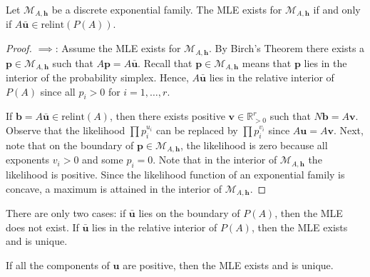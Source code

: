 \begin{mdframed}
\begin{thm}
  Let \( \mathcal{M}_{A, \mathbf h} \) be a discrete exponential family. The MLE exists for \( \mathcal{M}_{A, \mathbf{h}} \) if and only if \( A \bar{\mathbf u}  \in \mathrm{relint}(P(A))\).
\end{thm}
\end{mdframed}

\begin{proof}
  \( \implies \):
  Assume the MLE exists for \( \mathcal{M}_{A, \mathbf h} \). By Birch's Theorem there exists a \( \mathbf p \in \mathcal{M}_{A, \mathbf h} \) such that \( A \mathbf p = A \mathbf{\bar u} \). Recall that \(\mathbf  p \in \mathcal{M}_{A, \mathbf{h}} \) means that \( \mathbf p \) lies in the interior of the probability simplex. Hence, \( A \mathbf{\bar u} \) lies in the relative interior of \( P(A) \) since all \( p_i > 0 \) for \( i = 1, \dots, r \).

  If \( \mathbf b = A \mathbf{\bar u} \in \mathrm{relint}(A) \), then there exists positive \( \mathbf v \in \mathbb{R}^r_{> 0} \) such that \( N\mathbf b = A \mathbf{v} \). Observe that the likelihood \( \prod p_i^{u_i} \) can be replaced by \( \prod p_i^{v_i} \) since \( A \mathbf u = A \mathbf{v} \). Next, note that on the boundary of \( \mathbf{p} \in \mathcal{M}_{A, \mathbf{h}} \), the likelihood is zero because all exponents \( v_i > 0 \) and some \( p_i =0 \). Note that in the interior of \( \mathcal{M}_{A, \mathbf{h}} \) the likelihood is positive. Since the likelihood function of an exponential family is concave, a maximum is attained in the interior of \( \mathcal{M}_{A, \mathbf{h}} \).
\end{proof}

There are only two cases: if \( \bar{\mathbf u} \) lies on the boundary of \( P(A) \), then the MLE does not exist. If \( \bar{\mathbf u} \) lies in the relative interior of \( P(A) \), then the MLE exists and is unique.

\begin{cor}
  If all the components of \( \mathbf u \) are positive, then the MLE exists and is unique.
\end{cor}

